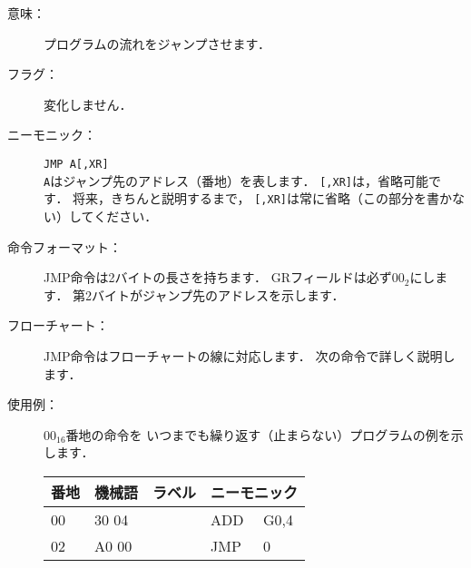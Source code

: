 \begin{description}
\item[意味：]プログラムの流れをジャンプさせます．
\item[フラグ：]変化しません．
\item[ニーモニック：]{\tt JMP A[,XR]} \\
{\tt A}はジャンプ先のアドレス（番地）を表します．
{\tt [,XR]}は，省略可能です．
将来，きちんと説明するまで，
{\tt [,XR]}は常に省略（この部分を書かない）してください．
\item[命令フォーマット：]JMP命令は2バイトの長さを持ちます．
GRフィールドは必ず$00_2$にします．
第2バイトがジャンプ先のアドレスを示します．


\item[フローチャート：]JMP命令はフローチャートの線に対応します．
次の命令で詳しく説明します．

\item[使用例：]
$00_{16}$番地の命令を
いつまでも繰り返す（止まらない）プログラムの例を示します．

{\tt\small\begin{center}
\begin{tabular}{|l|l|l|l l|} \hline
番地 & 機械語 & ラベル & \multicolumn{2}{|c|}{ニーモニック} \\
\hline
00 & 30 04 & & ADD  & G0,4 \\
02 & A0 00 & & JMP  & 0    \\
\hline
\end{tabular}
\end{center}}
\end{description}

